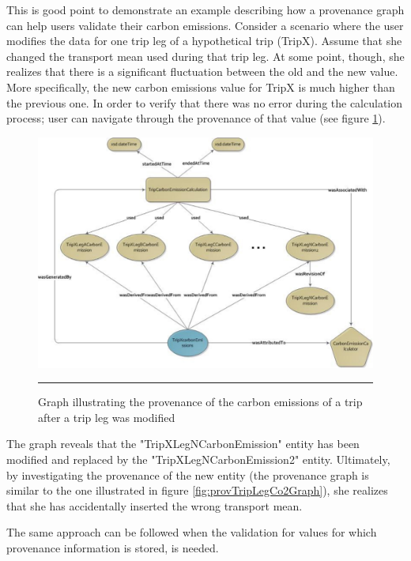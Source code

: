 This is good point to demonstrate an example describing how a provenance graph can help users validate their carbon emissions. Consider a scenario where the user modifies the data for one trip leg of a hypothetical trip (TripX). Assume that she changed the transport mean used during that trip leg. At some point, though, she realizes that there is a significant fluctuation between the old and the new value. More specifically, the new carbon emissions value for TripX is much higher than the previous one. In order to verify that there was no error during the calculation process; user can navigate through the provenance of that value (see figure \ref{fig:provTripCo2GraphRevision}).


\begin{figure}[htbp]
	\centering
		\includegraphics[scale=0.60]{./Figures/chapter3/figure4.pdf}
		\rule{35em}{0.5pt}
	\caption[Graph illustrating the provenance of the carbon emissions of a trip after a trip leg was modified]{Graph illustrating the provenance of the carbon emissions of a trip after a trip leg was modified}
	\label{fig:provTripCo2GraphRevision}
\end{figure}

The graph reveals that the "TripXLegNCarbonEmission" entity has been modified and replaced by the "TripXLegNCarbonEmission2" entity. Ultimately, by investigating the provenance of the new entity (the provenance graph is similar to the one illustrated in figure \ref{fig:provTripLegCo2Graph}), she realizes that she has accidentally inserted the wrong transport mean.

The same approach can be followed when the validation for values for which provenance information is stored, is needed.



